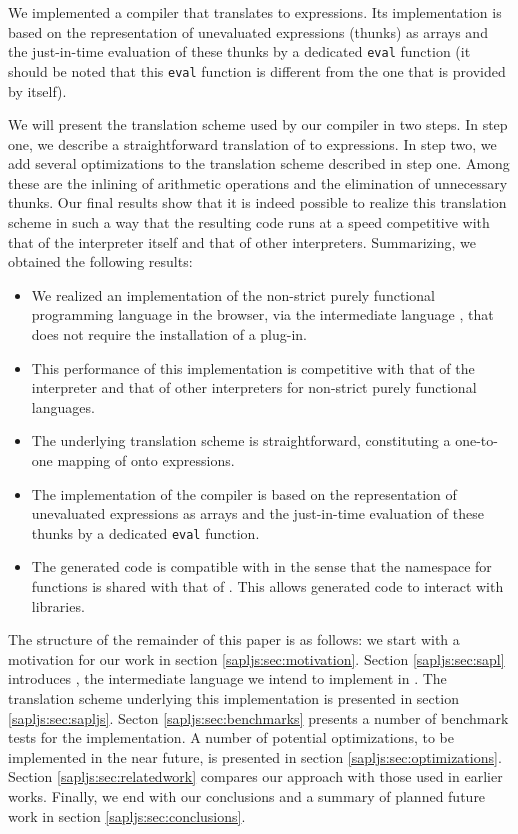 We implemented a compiler that translates \Sapl to \JS expressions. Its
implementation is based on the representation of unevaluated expressions
(thunks) as \JS arrays and the just-in-time evaluation of these thunks by a
dedicated \texttt{eval} function (it should be noted that this \texttt{eval}
function is different from the one that is provided by \JS itself).

We will present the translation scheme used by our compiler in two steps.
In step one, we describe a straightforward translation of \Sapl to \JS
expressions. In step two, we add several optimizations to the translation
scheme described in step one. Among these are the inlining of arithmetic
operations and the elimination of unnecessary thunks. Our final results show
that it is indeed possible to realize this translation scheme in such a way that
the resulting code runs at a speed competitive with that of the \Sapl
interpreter itself and that of other interpreters. Summarizing, we obtained the
following results:

\begin{itemize}
\item We realized an implementation of the non-strict purely functional
      programming language \Clean in the browser, via the intermediate language       \Sapl, that does not require the installation of a plug-in.
\item This performance of this implementation is competitive with that of the
      \Sapl interpreter and that of other interpreters for non-strict purely
      functional languages.
\item The underlying translation scheme is straightforward, constituting a
      one-to-one mapping of \Sapl onto \JS expressions.
\item The implementation of the compiler is based on the representation of
      unevaluated expressions as \JS arrays and the just-in-time evaluation of
      these thunks by a dedicated \texttt{eval} function.
\item The generated code is compatible with \JS in the sense that the namespace
      for functions is shared with that of \JS. This allows generated code to
      interact with \JS libraries.
\end{itemize}
The structure of the remainder of this paper is as follows: we start with a
motivation for our work in section \ref{sapljs:sec:motivation}. Section
\ref{sapljs:sec:sapl} introduces \Sapl, the intermediate language we intend to
implement in \JS. The translation scheme underlying this implementation is
presented in section \ref{sapljs:sec:sapljs}. Secton \ref{sapljs:sec:benchmarks}
presents a number of benchmark tests for the implementation. A number of
potential optimizations, to be implemented in the near future, is presented in
section \ref{sapljs:sec:optimizations}. Section \ref{sapljs:sec:relatedwork}
compares our approach with those used in earlier works. Finally, we end with our
conclusions and a summary of planned future work in section
\ref{sapljs:sec:conclusions}.

